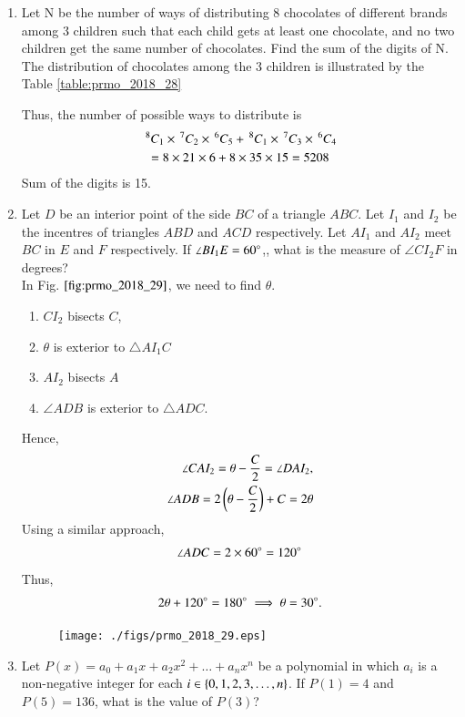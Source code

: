 \documentclass[journal,12pt,twocolumn]{IEEEtran}
\renewcommand\thesection{\arabic{section}}
\begin{document}
\begin{enumerate}[label=\thesection.\arabic*,ref=\thesection.\theenumi]
\item Let N be the number of ways of distributing 8 chocolates of different brands among 3 children such that each child gets at least one chocolate, and no two children get the same number of chocolates. Find the sum of the digits of N.
\\
\solution The distribution of chocolates among the 3 children is illustrated by the Table \ref{table:prmo_2018_28}
\begin{table}[!ht]
\centering

\caption{}
\label{table:prmo_2018_28}
\end{table}
%
Thus, the number of possible ways to distribute is 
\begin{multline}
\,^{8}C_{1}\times
\,^{7}C_{2}\times
\,^{6}C_{5}
+
\,^{8}C_{1}\times
\,^{7}C_{3}\times
\,^{6}C_{4} 
\\
= 8\times 21\times6+8\times35\times15 = 5208 
\end{multline}
%
Sum of the digits is 15.
\item Let $D$ be an interior point of the side $BC$ of a triangle $ABC$. Let $I_1$ and $I_2$ be the incentres of triangles $ABD$ and $ACD$ respectively. Let $AI_1$ and $AI_2$ meet $BC$ in $E$ and $F$ respectively. If $\angle BI_1E = 60 \degree$,, what is the measure of $\angle CI_2F$ in degrees?
\\
\solution In Fig. $\ref{fig:prmo_2018_29}$, we need to find $\theta$.  
\begin{enumerate}
\item $CI_2$ bisects $C$,  
\item $\theta$ is exterior to $\triangle AI_1 C$
\item $AI_2$ bisects $A$
\item $\angle ADB$ is exterior to $\triangle ADC$.
\end{enumerate}
Hence,
\begin{align}
\angle CAI_2 = \theta -\frac{C}{2} = \angle DAI_2,
\\
\angle ADB = 2\left(\theta -\frac{C}{2}\right) + C = 2\theta
\end{align}
%
Using a similar approach, 
\begin{align}
\angle ADC = 2\times 60 \degree = 120 \degree
\end{align}
Thus, 
\begin{align}
2\theta + 120 \degree = 180 \degree \implies \theta = 30 \degree.
\end{align}
\begin{figure}[!ht]
\centering
\texttt{[image: ./figs/prmo\_2018\_29.eps]}
\caption{}
\label{fig:prmo_2018_29}
\end{figure}
\item Let $P(x)= a_0 + a_1x+ a_2x^2 + \dots + a_nx^n$ be a polynomial in which $a_i$ is a non-negative integer for each $i \in \left\{0, 1, 2, 3, \dots ,n\right\}$. If $P(1) = 4$ and $P(5) = 136$, what is the value of $P(3)$?

\end{enumerate}
\end{document}

